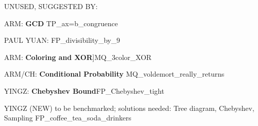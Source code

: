 \documentclass[quiz]{mcs}
\begin{document}
\begin{editingnotes}
UNUSED, SUGGESTED BY:

ARM: \textbf{GCD} TP\_ax=b\_congruence

PAUL YUAN: FP\_divisibility\_by\_9

ARM: \textbf{Coloring and XOR}]MQ\_3color\_XOR

ARM/CH: \textbf{Conditional Probability} MQ\_voldemort\_really\_returns

YINGZ: \textbf{Chebyshev Bound}FP\_Chebyshev\_tight

YINGZ (NEW) to be benchmarked; solutions needed: Tree diagram,
Chebyshev, Sampling FP\_coffee\_tea\_soda\_drinkers
\end{editingnotes}

\end{document}
